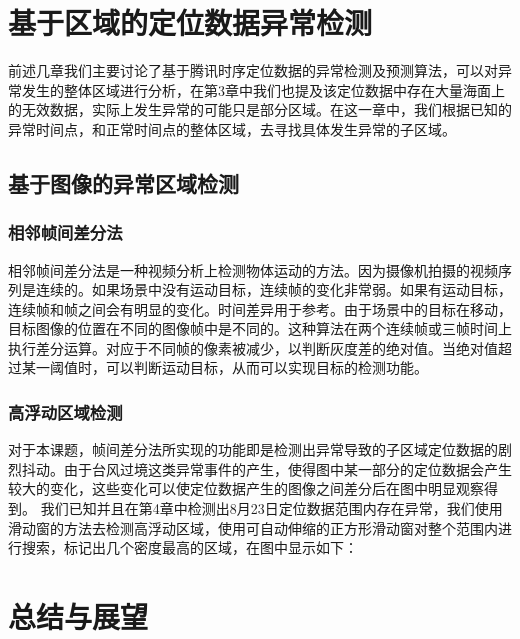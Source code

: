 \documentclass[a4paper,AutoFakeBold,oneside,12pt]{book}
\begin{document}
{{\chapter{基于区域的定位数据异常检测}
前述几章我们主要讨论了基于腾讯时序定位数据的异常检测及预测算法，可以对异常发生的整体区域进行分析，在第3章中我们也提及该定位数据中存在大量海面上的无效数据，实际上发生异常的可能只是部分区域。在这一章中，我们根据已知的异常时间点，和正常时间点的整体区域，去寻找具体发生异常的子区域。

\section{基于图像的异常区域检测}
\subsection{相邻帧间差分法}
相邻帧间差分法是一种视频分析上检测物体运动的方法。因为摄像机拍摄的视频序列是连续的。如果场景中没有运动目标，连续帧的变化非常弱。如果有运动目标，连续帧和帧之间会有明显的变化。时间差异用于参考。由于场景中的目标在移动，目标图像的位置在不同的图像帧中是不同的。这种算法在两个连续帧或三帧时间上执行差分运算。对应于不同帧的像素被减少，以判断灰度差的绝对值。当绝对值超过某一阈值时，可以判断运动目标，从而可以实现目标的检测功能。
\subsection{高浮动区域检测}
对于本课题，帧间差分法所实现的功能即是检测出异常导致的子区域定位数据的剧烈抖动。由于台风过境这类异常事件的产生，使得图中某一部分的定位数据会产生较大的变化，这些变化可以使定位数据产生的图像之间差分后在图中明显观察得到。
	我们已知并且在第4章中检测出8月23日定位数据范围内存在异常，我们使用滑动窗的方法去检测高浮动区域，使用可自动伸缩的正方形滑动窗对整个范围内进行搜索，标记出几个密度最高的区域，在图中显示如下：

\chapter{总结与展望}


}}
\end{document}
